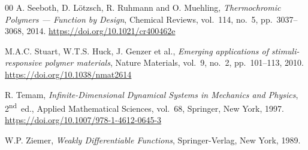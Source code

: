 \documentclass[final,1p,times]{elsarticle}
\numberwithin{equation}{section}
\begin{document}
\begin{thebibliography}{00}
	A. Seeboth, D. L\"otzsch, R. Ruhmann and O. Muehling,
	\textit{Thermochromic Polymers --- Function by Design},
	Chemical Reviews, vol.~114, no.~5, pp.~3037--3068, 2014.
	\newblock \url{https://doi.org/10.1021/cr400462e}
	
	M.A.C. Stuart, W.T.S. Huck, J. Genzer et al.,
	\textit{Emerging applications of stimuli-responsive polymer materials},
	Nature Materials, vol.~9, no.~2, pp.~101--113, 2010.
	\newblock \url{https://doi.org/10.1038/nmat2614}
	
	R. Temam,
	\textit{Infinite-Dimensional Dynamical Systems in Mechanics and Physics},
	2\textsuperscript{nd}~ed., Applied Mathematical Sciences, vol.~68,
	Springer, New York, 1997.
	\newblock \url{https://doi.org/10.1007/978-1-4612-0645-3}
	
	W.P. Ziemer,
	\textit{Weakly Differentiable Functions},
	Springer-Verlag, New York, 1989.
	
\end{thebibliography}
\end{document}
